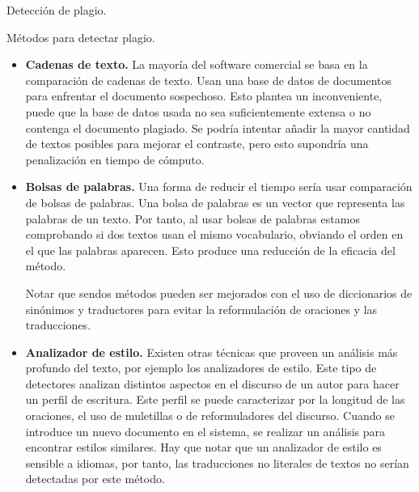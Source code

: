 \documentclass[12pt]{article}
\begin{document}
\begin{section}{Detecci\'on de plagio.}
\begin{subsection}{M\'etodos para detectar plagio.}
\begin{itemize}
			\item \textbf{Cadenas de texto.} La mayor\'ia del software comercial se basa en la comparaci\'on de cadenas de texto. Usan una base de datos de documentos para enfrentar el documento sospechoso. Esto plantea un inconveniente, puede que la base de datos usada no sea suficientemente extensa o no contenga el documento plagiado. Se podr\'ia intentar a\~nadir la mayor cantidad de textos posibles para mejorar el contraste, pero esto supondr\'ia una penalizaci\'on en tiempo de c\'omputo.\\
			
			\item \textbf{Bolsas de palabras.} Una forma de reducir el tiempo ser\'ia usar comparaci\'on de bolsas de palabras. Una bolsa de palabras es un vector que representa las palabras de un texto. Por tanto, al usar bolsas de palabras estamos comprobando si dos textos usan el mismo vocabulario, obviando el orden en el que las palabras aparecen. Esto produce una reducci\'on de la eficacia del m\'etodo.
			
			Notar que sendos m\'etodos pueden ser mejorados con el uso de diccionarios de sin\'onimos y traductores para evitar la reformulaci\'on de oraciones y las traducciones.\\
			
			\item \textbf{Analizador de estilo.} Existen otras t\'ecnicas que proveen un an\'alisis m\'as profundo del texto, por ejemplo los analizadores de estilo. Este tipo de detectores analizan distintos aspectos en el discurso de un autor para hacer un perfil de escritura. Este perfil se puede caracterizar por la longitud de las oraciones, el uso de muletillas o de reformuladores del discurso. Cuando se introduce un nuevo documento en el sistema, se realizar un an\'alisis para encontrar estilos similares. Hay que notar que un analizador de estilo es sensible a idiomas, por tanto, las traducciones no literales de textos no ser\'ian detectadas por este m\'etodo.
			
			\end{itemize}
		\end{subsection}
		

\end{section}
\end{document}
